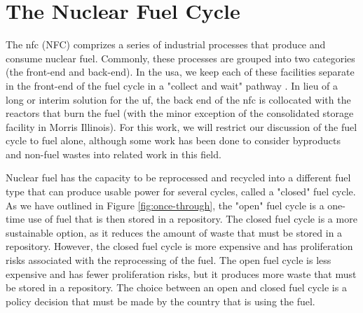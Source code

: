 \section{The Nuclear Fuel Cycle}
\label{sec:nfc}

The \acrlong{nfc} (NFC) comprizes a series of industrial processes that produce and consume nuclear fuel. Commonly, these processes are grouped into two categories (the front-end and back-end). In the \gls{usa}, we keep each of these facilities separate in the front-end of the fuel cycle in a "collect and wait" pathway \cite{cycle_risks}. In lieu of a long or interim solution for the \gls{uf}, the back end of the \gls{nfc} is collocated with the reactors that burn the fuel (with the minor exception of the consolidated storage facility in Morris Illinois). For this work, we will restrict our discussion of the fuel cycle to fuel alone, although some work has been done to consider byproducts and non-fuel wastes into related work in this field.


Nuclear fuel has the capacity to be reprocessed and recycled into a different fuel type that can produce usable power for several cycles, called a "closed" fuel cycle. As we have outlined in Figure \ref{fig:once-through}, the "open" fuel cycle is a one-time use of fuel that is then stored in a repository. The closed fuel cycle is a more sustainable option, as it reduces the amount of waste that must be stored in a repository. However, the closed fuel cycle is more expensive and has proliferation risks associated with the reprocessing of the fuel. The open fuel cycle is less expensive and has fewer proliferation risks, but it produces more waste that must be stored in a repository. The choice between an open and closed fuel cycle is a policy decision that must be made by the country that is using the fuel.










